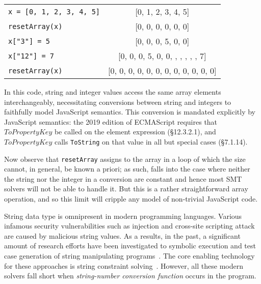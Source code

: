 \documentclass[sigplan,review,anonymous]{acmart}\settopmatter{printfolios=true,printccs=false,printacmref=false}
\begin{document}
\begin{tabular}{l|c}
	{\tt{x = [0, 1, 2, 3, 4, 5]}} & [0, 1, 2, 3, 4, 5] \\
	{\tt{resetArray(x)}} & [0, 0, 0, 0, 0, 0] \\
	{\tt{x["3"] = 5}} & [0, 0, 0, 5, 0, 0] \\
	{\tt{x["12"] = 7}} & [0, 0, 0, 5, 0, 0, , , , , , 7] \\
	{\tt{resetArray(x)}} & [0, 0, 0, 0, 0, 0, 0, 0, 0, 0, 0, 0] \\
\end{tabular}

In this code, string and integer values access the same array elements interchangeably, necessitating conversions between string and integers to faithfully model JavaScript semantics.  This conversion is mandated explicitly by JavaScript semantics: the 2019 edition of ECMAScript requires that $ToPropertyKey$ be called on the element expression (\S{12.3.2.1}), and $ToPropertyKey$ calls {\tt{ToString}} on that value in all but special cases (\S{7.1.14}).

Now observe that {\tt{resetArray}} assigns to the array in a loop of which the size cannot, in general, be known a priori; as such, falls into the case where neither the string nor the integer in a conversion are constant and hence most SMT solvers will not be able to handle it.  But this is a rather straightforward array operation, and so this limit will cripple any model of non-trivial JavaScript code.





String data type is omnipresent in modern programming languages. Various infamous security vulnerabilities such as injection and cross-site scripting attack are caused by malicious string values. As a results, in the past, a significant amount of research efforts have been investigated to symbolic execution and test case generation of string manipulating programs~\cite{saxena2010symbolic,artzi2011framework,huang2004securing,sen2013jalangi}. The core enabling technology for these approaches is string constraint solving~\cite{kiezun2009hampi,abdulla2014string,zheng2013z3,abdulla2015norn,abdulla2017flatten,wang2016string,abdulla2018trau,chen2019decision,zheng2017z3str2}. However, all these modern solvers fall short when \textit{string-number conversion function} occurs in the program.
\end{document}
